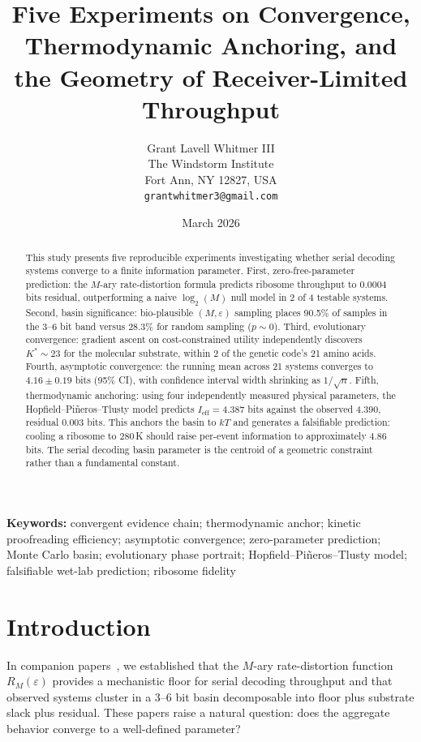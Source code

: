 \documentclass[12pt,a4paper]{article}
\title{Five Experiments on Convergence, Thermodynamic Anchoring, and the Geometry of Receiver-Limited Throughput}
\author{Grant Lavell Whitmer III\\
The Windstorm Institute\\
Fort Ann, NY 12827, USA\\
\texttt{grantwhitmer3@gmail.com}}
\date{March 2026}
\begin{document}
\maketitle

\begin{abstract}
This study presents five reproducible experiments investigating whether serial decoding systems converge to a finite information parameter. First, zero-free-parameter prediction: the $M$-ary rate-distortion formula predicts ribosome throughput to 0.0004 bits residual, outperforming a naive $\log_2(M)$ null model in 2 of 4 testable systems. Second, basin significance: bio-plausible $(M, \varepsilon)$ sampling places 90.5\% of samples in the 3--6 bit band versus 28.3\% for random sampling ($p \sim 0$). Third, evolutionary convergence: gradient ascent on cost-constrained utility independently discovers $K^* \sim 23$ for the molecular substrate, within 2 of the genetic code's 21 amino acids. Fourth, asymptotic convergence: the running mean across 21 systems converges to $4.16 \pm 0.19$ bits (95\% CI), with confidence interval width shrinking as $1/\sqrt{n}$. Fifth, thermodynamic anchoring: using four independently measured physical parameters, the Hopfield--Pi\~neros--Tlusty model predicts $I_{\mathrm{eff}} = 4.387$ bits against the observed 4.390, residual 0.003 bits. This anchors the basin to $kT$ and generates a falsifiable prediction: cooling a ribosome to 280\,K should raise per-event information to approximately 4.86 bits. The serial decoding basin parameter is the centroid of a geometric constraint rather than a fundamental constant.
\end{abstract}

\noindent\textbf{Keywords:} convergent evidence chain; thermodynamic anchor; kinetic proofreading efficiency; asymptotic convergence; zero-parameter prediction; Monte Carlo basin; evolutionary phase portrait; Hopfield--Pi\~neros--Tlusty model; falsifiable wet-lab prediction; ribosome fidelity

\section{Introduction}

In companion papers~\cite{whitmer2026floor,whitmer2026basin}, we established that the $M$-ary rate-distortion function $R_M(\varepsilon)$ provides a mechanistic floor for serial decoding throughput and that observed systems cluster in a 3--6 bit basin decomposable into floor plus substrate slack plus residual. These papers raise a natural question: does the aggregate behavior converge to a well-defined parameter?
\end{document}
